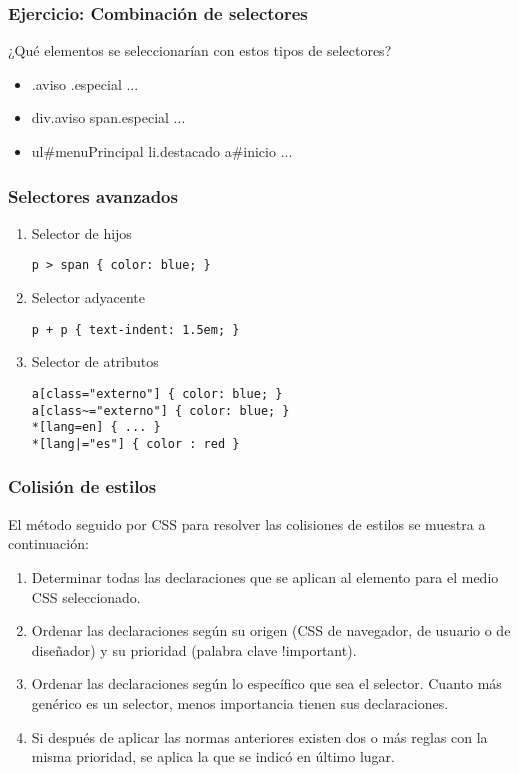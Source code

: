 
\begin{frame}
\frametitle{Ejercicio: Combinación de selectores}

¿Qué elementos se seleccionarían con estos tipos de selectores?

\begin{itemize}
  \item .aviso .especial { ... }
  \item div.aviso span.especial { ... }
  \item ul\#menuPrincipal li.destacado a\#inicio { ... }
\end{itemize}

\end{frame}


\begin{frame}[fragile]
\frametitle{Selectores avanzados}

\begin{enumerate}
  \item Selector de hijos
\begin{verbatim}
p > span { color: blue; }
\end{verbatim}
  \item Selector adyacente
\begin{verbatim}
p + p { text-indent: 1.5em; }
\end{verbatim}
  \item Selector de atributos
\begin{verbatim}
a[class="externo"] { color: blue; }
a[class~="externo"] { color: blue; }
*[lang=en] { ... }
*[lang|="es"] { color : red }
\end{verbatim}
\end{enumerate}

\end{frame}


\begin{frame}
\frametitle{Colisión de estilos}

El método seguido por CSS para resolver las colisiones de estilos se muestra a continuación:

\begin{enumerate}
  \item Determinar todas las declaraciones que se aplican al elemento para el medio CSS seleccionado.
  \item Ordenar las declaraciones según su origen (CSS de navegador, de usuario o de diseñador) y su prioridad (palabra clave !important).
  \item Ordenar las declaraciones según lo específico que sea el selector. Cuanto más genérico es un selector, menos importancia tienen sus declaraciones.
  \item Si después de aplicar las normas anteriores existen dos o más reglas con la misma prioridad, se aplica la que se indicó en último lugar.
\end{enumerate}

\end{frame}

